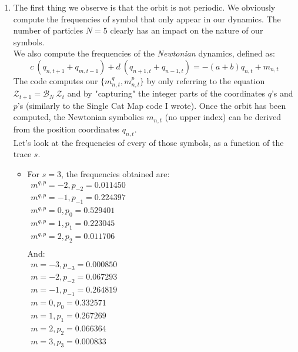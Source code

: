 \begin{enumerate}
\item
The first thing we observe is that the orbit is not periodic. We obviously compute the frequencies of symbol that only appear in our dynamics. The number of particles $N = 5$ clearly has an impact on the nature of our symbols. \\
We also compute the frequencies of the \textit{Newtonian} dynamics, defined as:
\[
c\:(q_{n,t+1} + q_{m,t-1}) + d\:(q_{n+1,t} + q_{n-1,t}) = -(a+b)q_{n,t} + m_{n,t}
\]
The code computes our $\{m^q_{n,t}, m^p_{n,t}\}$ by only referring to the equation $\mathcal{Z}_{t+1} = \mathcal{B}_N \: \mathcal{Z}_t$ and by "capturing" the integer parts of the coordinates $q$'s and $p$'s (similarly to the Single Cat Map code I wrote). Once the orbit has been computed, the Newtonian symbolics $m_{n,t}$ (no upper index) can be derived from the position coordinates $q_{n,t}$.\\
Let's look at the frequencies of every of those symbols, as a function of the trace $s$.


\begin{itemize}

\item
For $s = 3$, the frequencies obtained are: \\
$
\begin{array}{l}
m^{q,p} = -2, p_{-2} = 0.011450 \\
m^{q,p} = -1, p_{-1} = 0.224397 \\
m^{q,p} = 0, p_{0} = 0.529401 \\
m^{q,p} = 1, p_{1} = 0.223045 \\
m^{q,p} = 2, p_{2} = 0.011706 \\
\end{array}
$
\\And: \\
$
\begin{array}{l}
m = -3, p_{-3} = 0.000850 \\
m = -2, p_{-2} = 0.067293 \\
m = -1, p_{-1} = 0.264819 \\
m = 0, p_{0} = 0.332571 \\
m = 1, p_{1} = 0.267269 \\
m = 2, p_{2} = 0.066364 \\
m = 3, p_{3} = 0.000833 \\
\end{array}
$
\\


\end{itemize}
\end{enumerate}
